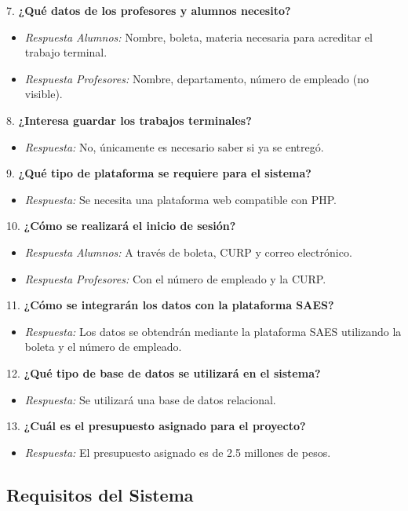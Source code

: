 7. \textbf{¿Qué datos de los profesores y alumnos necesito?}
   \begin{itemize}
       \item \textit{Respuesta Alumnos:} Nombre, boleta, materia necesaria para acreditar el trabajo terminal.
       \item \textit{Respuesta Profesores:} Nombre, departamento, número de empleado (no visible).
   \end{itemize}

8. \textbf{¿Interesa guardar los trabajos terminales?}
   \begin{itemize}
       \item \textit{Respuesta:} No, únicamente es necesario saber si ya se entregó.
   \end{itemize}

9. \textbf{¿Qué tipo de plataforma se requiere para el sistema?}
   \begin{itemize}
       \item \textit{Respuesta:} Se necesita una plataforma web compatible con PHP.
   \end{itemize}

10. \textbf{¿Cómo se realizará el inicio de sesión?}
   \begin{itemize}
       \item \textit{Respuesta Alumnos:} A través de boleta, CURP y correo electrónico.
       \item \textit{Respuesta Profesores:} Con el número de empleado y la CURP.
   \end{itemize}

11. \textbf{¿Cómo se integrarán los datos con la plataforma SAES?}
   \begin{itemize}
       \item \textit{Respuesta:} Los datos se obtendrán mediante la plataforma SAES utilizando la boleta y el número de empleado.
   \end{itemize}

12. \textbf{¿Qué tipo de base de datos se utilizará en el sistema?}
   \begin{itemize}
       \item \textit{Respuesta:} Se utilizará una base de datos relacional.
   \end{itemize}

13. \textbf{¿Cuál es el presupuesto asignado para el proyecto?}
   \begin{itemize}
       \item \textit{Respuesta:} El presupuesto asignado es de 2.5 millones de pesos.
   \end{itemize}

\subsection{Requisitos del Sistema}


